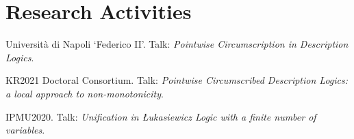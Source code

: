 \documentclass[letterpaper]{deedy-resume} %
\begin{document}
\begin{minipage}[t]{0.33\textwidth} %

\section{}

\end{minipage} %
\hfill
\begin{minipage}[t]{0.66\textwidth} %

\section{Research Activities} 
\sectionspace
\begin{tightitemize}
\item Università di Napoli `Federico II'. Talk: \emph{Pointwise Circumscription in Description Logics}.
\item KR2021 Doctoral Consortium. Talk: \emph{Pointwise Circumscribed Description Logics: a local approach to non-monotonicity}.
\item IPMU2020. Talk: \emph{Unification in {\L}ukasiewicz Logic with a finite number of variables}.
\end{tightitemize}
%

\end{minipage} %

\end{document}

